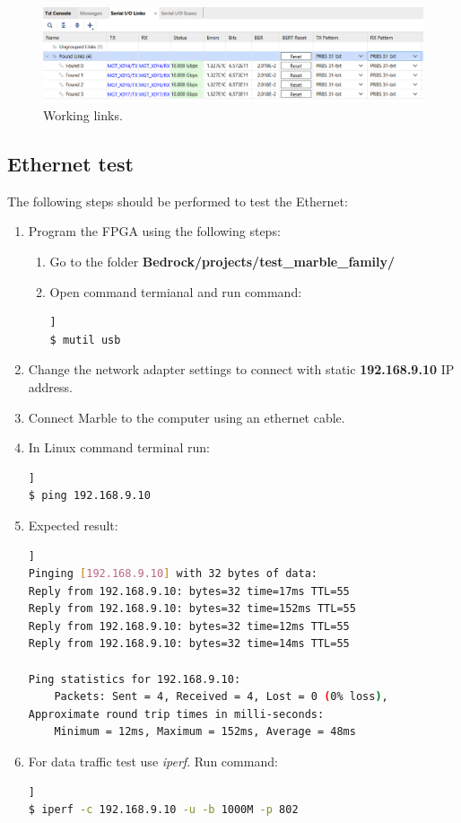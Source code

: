 \documentclass[12pt,oneside,a4]{article}
\begin{document}
\begin{figure}[H]
\begin{center}
\includegraphics[width=1\linewidth]{links.png}
 \caption{Working links.}\label{links}
\end{center}
\end{figure}

\subsection{Ethernet test}
The following steps should be performed to test the Ethernet:
\begin{enumerate}
    \item Program the FPGA using the following steps:
	\begin{enumerate}
	\item Go to the folder \textbf{Bedrock/projects/test\_marble\_family/}
	\item Open command termianal and run command: 
	\begin{lstlisting}[backgroundcolor = \color{Gainsboro}, language=bash, frame=none]]
$ mutil usb
	\end{lstlisting}
	\end{enumerate}
    \item Change the network adapter settings to connect with static \textbf{192.168.9.10} IP address.
    \item Connect Marble to the computer using an ethernet cable. 
    \item In Linux command terminal run:
    \begin{lstlisting}[backgroundcolor = \color{Gainsboro}, language=bash, frame=none]]
$ ping 192.168.9.10
	\end{lstlisting}
    \item Expected result:
    \begin{lstlisting}[backgroundcolor = \color{Gainsboro}, language=bash, frame=none]]
Pinging [192.168.9.10] with 32 bytes of data:
Reply from 192.168.9.10: bytes=32 time=17ms TTL=55
Reply from 192.168.9.10: bytes=32 time=152ms TTL=55
Reply from 192.168.9.10: bytes=32 time=12ms TTL=55
Reply from 192.168.9.10: bytes=32 time=14ms TTL=55

Ping statistics for 192.168.9.10:
    Packets: Sent = 4, Received = 4, Lost = 0 (0% loss),
Approximate round trip times in milli-seconds:
    Minimum = 12ms, Maximum = 152ms, Average = 48ms
	\end{lstlisting}
    \item For data traffic test use \textit{iperf}. Run command:
    \begin{lstlisting}[backgroundcolor = \color{Gainsboro}, language=bash, frame=none]]
$ iperf -c 192.168.9.10 -u -b 1000M -p 802
	\end{lstlisting}
\end{enumerate}
\end{document}
